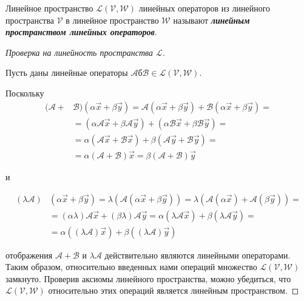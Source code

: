 \begin{definition}
    Линейное пространство $\mathcal{L}(\mathcal{V}, \mathcal{W})$ линейных операторов из линейного пространства $\mathcal{V}$ в линейное пространство $\mathcal{W}$ называют \textbf{\textit{линейным пространством линейных операторов}}.
\end{definition}

\begin{proof}[Проверка на линейность пространства $\mathcal{L}$]~

    Пусть даны линейные операторы $\mathscr{A}б \mathscr{B} \in \mathcal{L}(\mathcal{V}, \mathcal{W})$. 

    Поскольку
    \begin{align*}
        (\mathscr{A} + &\mathscr{B})(\alpha\vec{x} + \beta \vec{y}) = \mathscr{A}(\alpha\vec{x} + \beta \vec{y}) + \mathscr{B}(\alpha\vec{x} + \beta \vec{y}) = \\
        &= (\alpha\mathscr{A}\vec{x} + \beta\mathscr{A}\vec{y}) + (\alpha\mathscr{B}\vec{x} + \beta\mathscr{B}\vec{y}) = \\
        &= \alpha(\mathscr{A}\vec{x} + \mathscr{B}\vec{x}) + \beta(\mathscr{A}\vec{y} + \mathscr{B}\vec{y}) = \\
        &= \alpha(\mathscr{A} + \mathscr{B})\vec{x} = \beta(\mathscr{A} + \mathscr{B})\vec{y}
    \end{align*}

    и

    \begin{align*}
        (\lambda\mathscr{A})&(\alpha\vec{x} + \beta \vec{y}) = \lambda(\mathscr{A}(\alpha\vec{x} + \beta\vec{y})) = \lambda (\mathscr{A}(\alpha\vec{x}) + \mathscr{A}(\beta\vec{y})) = \\ 
        &= (\alpha \lambda)\mathscr{A}\vec{x} + (\beta \lambda)\mathscr{A}\vec{y} = \alpha(\lambda \mathscr{A}\vec{x}) + \beta(\lambda \mathscr{A}\vec{y}) = \\
        &= \alpha((\lambda\mathscr{A})\vec{x}) + \beta((\lambda\mathscr{A})\vec{y})
    \end{align*}

    отображения $\mathscr{A} + \mathscr{B}$ и $\lambda \mathscr{A}$ действительно являются линейными операторами. Таким образом, относительно введенных нами операций множество $\mathcal{L}(\mathcal{V}, \mathcal{W})$ замкнуто. Проверив аксиомы линейного пространства, можно убедиться, что $\mathcal{L}(\mathcal{V}, \mathcal{W})$ относительно этих операций является линейным пространством.
\end{proof}